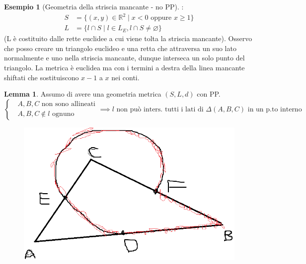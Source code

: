 \documentclass[a4paper,10pt]{article}
\theoremstyle{definition}
\newcommand{\re}{\mathbb{R}} %
\theoremstyle{indentdefinition}
\theoremstyle{indentpostulate}
\theoremstyle{indenttheorem}
\newtheorem{lem*}{Lemma}[section]
\theoremstyle{myremark}
\newtheorem{example*}{Esempio}
\theoremstyle{indentgeneral}
\begin{document}
\begin{example*}[Geometria della striscia mancante - no PP]:
\begin{align*}
    S&=\{ (x,y) \in \re^2 \mid x<0 \text{ oppure } x \ge 1 \}\\
    L&=\{ l\cap S \mid l\in L_E,l\cap S\ne\varnothing\}
\end{align*} (L è costituito dalle rette euclidee a cui viene tolta la striscia mancante).  Osservo che posso creare un triangolo euclideo e una retta che attraversa un suo lato normalmente e uno nella striscia mancante, dunque interseca un solo punto del triangolo. La metrica è euclidea ma con i termini a destra della linea mancante shiftati che sostituiscono $x-1$ a $x$ nei conti.   \end{example*} 

\begin{lem*}  Assumo di avere una geometria metrica $(S,L,d)$ con PP. 
$$\begin{cases}
    \text{ $A,B,C$ non sono allineati}\\
    \text{ $A,B,C\notin l$ ognuno}
\end{cases}\implies \text{$l$  non può inters. tutti i lati di $\Delta (A,B,C)$ in un p.to interno}$$
\end{lem*} 

\begin{figure}[H]
    \centering
    \includegraphics[scale=0.2]{Pasch.png}
\end{figure}
\end{document}
